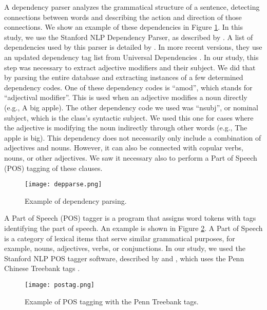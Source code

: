 \documentclass[smallextended,natbib]{svjour3}       %
\begin{document}
    A dependency parser analyzes the grammatical structure of a sentence, detecting connections between words and describing the action and direction of those connections. We show an example of these dependencies in Figure \ref{fig:depparse}. In this study, we use the Stanford NLP Dependency Parser, as described by \cite{chen-EMNLP:2014}. A list of dependencies used by this parser is detailed by \cite{marneffe_manning_2016_depparse_manual}. In more recent versions, they use an updated dependency tag list from Universal Dependencies \cite[][]{zeman2018conll}. In our study, this step was necessary to extract adjective modifiers and their subject. We did that by parsing the entire database and extracting instances of a few determined dependency codes. One of these dependency codes is ``amod'', which stands for ``adjectival modifier''. This is used when an adjective modifies a noun directly (e.g., A big apple). The other dependency code we used was ``nsubj'', or nominal subject, which is the class's syntactic subject. We used this one for cases where the adjective is modifying the noun indirectly through other words (e.g., The apple is big). This dependency does not necessarily only include a combination of adjectives and nouns. However, it can also be connected with copular verbs, nouns, or other adjectives. We saw it necessary also to perform a Part of Speech (POS) tagging of these clauses.

    \begin{figure}[ht]
    \centering
    \texttt{[image: depparse.png]}
    \caption{Example of dependency parsing.}
    \label{fig:depparse}
    \end{figure}

    A Part of Speech (POS) tagger is a program that assigns word tokens with tags identifying the part of speech. An example is shown in Figure \ref{fig:postag}. A Part of Speech is a category of lexical items that serve similar grammatical purposes, for example, nouns, adjectives, verbs, or conjunctions. In our study, we used the Stanford NLP POS tagger software, described by \cite{toutanova2000enriching} and \cite{toutanova2003feature}, which uses the Penn Chinese Treebank tags \cite[][]{xia_penntreebank}.

    \begin{figure}[ht]
    \centering
    \texttt{[image: postag.png]}
    \caption{Example of POS tagging with the Penn Treebank tags.}
    \label{fig:postag}
    \end{figure}
\end{document}
